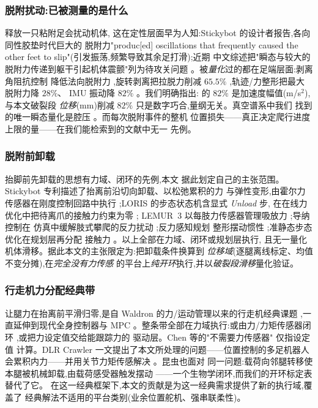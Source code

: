 \documentclass[journal]{IEEEtran}
\begin{document}
\subsubsection{脱附扰动:已被测量的是什么}释放一只粘附足会扰动机体,
这在定性层面早为人知:Stickybot 的设计者报告,各向同性胶垫时代巨大的
脱附力"produc[ed] oscillations that frequently caused the other feet
to slip"(引发振荡,频繁导致其余足打滑)\cite{kim2008smooth};近期
中文综述把"瞬态与较大的脱附力传递到躯干引起机体震颤"列为待攻关问题
\cite{pei2023review}。被\emph{量化}过的都在足端层面:剥离角阻抗控制
降低法向脱附力 \cite{wang2021compliant},旋转剥离把拉脱力削减
$65.5\%$ \cite{wen2025force},轨迹/力整形把最大脱附力降 $28\%$、
IMU 振动降 $82\%$ \cite{xiao2025ftfof}。我们明确指出:
\cite{xiao2025ftfof} 的 $82\%$ 是加速度幅值(m/s$^2$),与本文破裂段
\emph{位移}(mm)削减 $82\%$ 只是数字巧合,量纲无关。真空谱系中我们
找到的唯一瞬态量化是腔压 \cite{pan2005suction}。而每次脱附事件的整机
位置损失——真正决定爬行进度上限的量——在我们能检索到的文献中无一
先例。

\subsubsection{脱附前卸载}抬脚前先卸载的思想有力域、闭环的先例,本文
据此划定自己的主张范围。Stickybot 专利描述了抬离前沿切向卸载、以松弛累积的力
与弹性变形,由霍尔力传感器在刚度控制回路中执行
\cite{cutkosky2010patent};LORIS 的步态状态机含显式 \emph{Unload} 步,
在在线力优化中把待离爪的接触力约束为零 \cite{nadan2024loris};
LEMUR~3 以每肢力传感器管理吸放力 \cite{parness2017lemur};导纳控制在
仿真中缓解肢式攀爬的反力扰动 \cite{imai2024admittance};反力感知规划
整形摆动惯性 \cite{ribeiro2023ramp};准静态步态优化在规划层再分配
接触力 \cite{boscariol2013optimal}。以上全部在力域、闭环或规划层执行,
且无一量化机体滑移。据此本文的主张限定为:把卸载条件换算到
\emph{位移域}(逐腿离线标定、均值不变分摊),在\emph{完全没有力传感}
的平台上\emph{纯开环}执行,并以\emph{破裂段滑移}量化验证。

\subsubsection{行走机力分配经典带}让腿力在抬离前平滑归零,是自
Waldron 的力/运动管理以来的行走机经典课题
\cite{waldron1986force,kumar1988force,klein1990optimal,zhou2000fricom,
erden2007torque},一直延伸到现代全身控制器与 MPC
\cite{righetti2013optimal,bellicoso2016perception,focchi2017high,
dicarlo2018dynamic}。整条带全部在力域执行:或由力/力矩传感器闭环
\cite{gorinevsky1990force,gorner2009dlr},或把力设定值交给能跟踪力的
驱动层。Chen 等的"不需要力传感器"\cite{chen1999optimal} 仅指设定值
计算。DLR Crawler 一文提出了本文所处理的问题——位置控制的多足机器人
会累积内力——并用关节力矩传感解决 \cite{gorner2009dlr}。昆虫也面对
同一问题:载荷向邻腿转移使本腿被机械卸载,由载荷感受器触发摆动
\cite{dallmann2017load}——一个生物学闭环,而我们的开环标定表替代了它。
在这一经典框架下,本文的贡献是为这一经典需求提供了新的执行域,覆盖了
经典解法不适用的平台类别(业余位置舵机、强串联柔性)。
\end{document}
